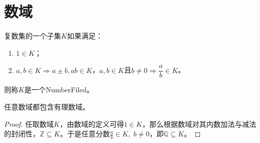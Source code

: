 \section{数域}

\begin{definition}
	复数集的一个子集$K$如果满足：
	\begin{enumerate}
		\item $1\in K$；
		\item $a,b\in K\Rightarrow a\pm b,ab\in K$，$a,b\in K$且$b\ne0\Rightarrow\dfrac{a}{b}\in K$。
	\end{enumerate}
	则称$K$是一个\gls{NumberFiled}。
\end{definition}
\begin{theorem}
	任意数域都包含有理数域。
\end{theorem}
\begin{proof}
	任取数域$K$，由数域的定义可得$1\in K$，那么根据数域对其内数加法与减法的封闭性，$\mathbb{Z}\subseteq K$。于是任意分数$\frac{a}{b}\in K,\;b\ne0$，即$\mathbb{Q}\subseteq K$。
\end{proof}
